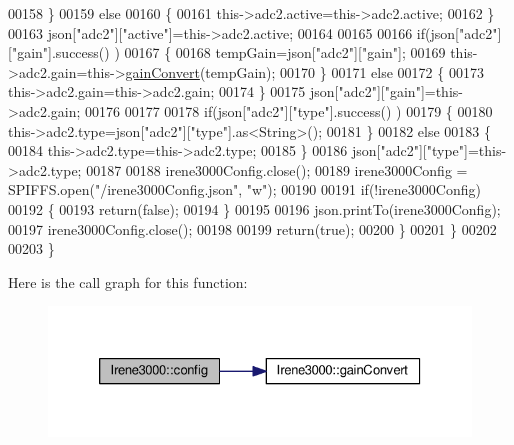 \begin{DoxyCode}
00158             \}
00159             \textcolor{keywordflow}{else}
00160             \{
00161                 this->adc2.active=this->adc2.active;
00162             \}
00163             json[\textcolor{stringliteral}{"adc2"}][\textcolor{stringliteral}{"active"}]=this->adc2.active;
00164 
00165             
00166             \textcolor{keywordflow}{if}(json[\textcolor{stringliteral}{"adc2"}][\textcolor{stringliteral}{"gain"}].success() )
00167             \{           
00168                 tempGain=json[\textcolor{stringliteral}{"adc2"}][\textcolor{stringliteral}{"gain"}];
00169                 this->adc2.gain=this->\hyperlink{class_irene3000_abcad62d1201a59f8dd3ba87048002728}{gainConvert}(tempGain);
00170             \}
00171             \textcolor{keywordflow}{else}
00172             \{
00173                 this->adc2.gain=this->adc2.gain;
00174             \}
00175             json[\textcolor{stringliteral}{"adc2"}][\textcolor{stringliteral}{"gain"}]=this->adc2.gain;
00176 
00177             
00178             \textcolor{keywordflow}{if}(json[\textcolor{stringliteral}{"adc2"}][\textcolor{stringliteral}{"type"}].success() )
00179             \{
00180                 this->adc2.type=json[\textcolor{stringliteral}{"adc2"}][\textcolor{stringliteral}{"type"}].as<String>(); 
00181             \}
00182             \textcolor{keywordflow}{else}
00183             \{
00184                 this->adc2.type=this->adc2.type;
00185             \}
00186             json[\textcolor{stringliteral}{"adc2"}][\textcolor{stringliteral}{"type"}]=this->adc2.type;
00187 
00188             irene3000Config.close();
00189             irene3000Config = SPIFFS.open(\textcolor{stringliteral}{"/irene3000Config.json"}, \textcolor{stringliteral}{"w"});
00190 
00191             \textcolor{keywordflow}{if}(!irene3000Config)
00192             \{
00193                 \textcolor{keywordflow}{return}(\textcolor{keyword}{false});
00194             \}
00195 
00196             json.printTo(irene3000Config);
00197             irene3000Config.close();
00198 
00199             \textcolor{keywordflow}{return}(\textcolor{keyword}{true}); 
00200         \}
00201     \}   
00202 
00203 \}
\end{DoxyCode}
Here is the call graph for this function\+:\nopagebreak
\begin{figure}[H]
\begin{center}
\leavevmode
\includegraphics[width=326pt]{class_irene3000_afed5c35e4b23963c157847ef27c11e9c_cgraph}
\end{center}
\end{figure}
